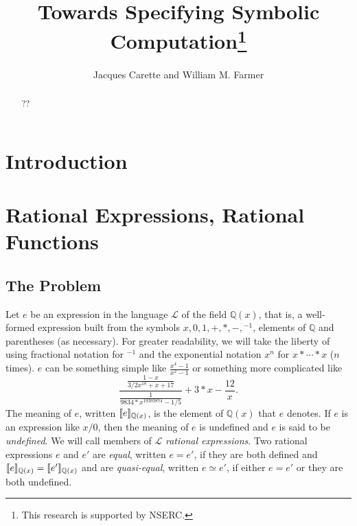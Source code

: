 \documentclass[fleqn]{llncs}
\title{Towards Specifying Symbolic Computation\thanks{This research is
    supported by NSERC.}}
\author{Jacques Carette and William M. Farmer}
\institute{%
Computing and Software, McMaster University, Canada\\
\url{http://www.cas.mcmaster.ca/~carette}\\
\url{http://imps.mcmaster.ca/wmfarmer}\\[1.5ex]
}
\begin{document}
\maketitle

\begin{abstract}
??
\end{abstract}

\iffalse 

\textbf{Keywords:} ??

\fi

\section{Introduction}

\newcommand{\QQ}{\ensuremath{\mathbb{Q}}}
\newcommand{\NRE}{\ensuremath{\mname{normRatExpr}}}
\newcommand{\funQ}[1]{\ensuremath{\LambdaApp x : \QQ \mdot#1}}
\newcommand{\Lang}{\ensuremath{\mathcal{L}}}

\section{Rational Expressions, Rational Functions}

\subsection{The Problem}

Let $e$ be an expression in the language $\Lang$ of the field
$\QQ(x)$, that is, a well-formed expression built from the symbols $x,
0, 1, +, *, -, \phantom{}^{-1}$, elements of $\QQ$ and parentheses (as
necessary).  For greater readability, we will take the liberty of
using fractional notation for $\phantom{}^{-1}$ and the exponential
notation $x^n$ for $x * \cdots * x$ ($n$ times).  $e$ can be something
simple like $\frac{x^4-1}{x^2-1}$ or something more complicated like
\begin{equation*}
\frac{\frac{1-x}{3/2 x^{18} + x + 17}}
     {\frac{1}{9834*x^{19393874}-1/5}}+3*x -\frac{12}{x}.
\end{equation*}
The meaning of $e$, written $\llbracket e\rrbracket_{\mathbb{Q}(x)}$, is the
element of $\QQ(x)$ that $e$ denotes.  If $e$ is an expression like
$x/0$, then the meaning of $e$ is undefined and $e$ is said to be
\emph{undefined}.  We will call members of $\Lang$ \emph{rational
  expressions}.  Two rational expressions $e$ and $e'$ are
\emph{equal}, written $e = e'$, if they are both defined and
$\llbracket e\rrbracket_{\mathbb{Q}(x)} = \llbracket e'\rrbracket_{\mathbb{Q}(x)}$ and are
\emph{quasi-equal}, written $e \simeq e'$, if either $e = e'$ or they
are both undefined.
\end{document}
